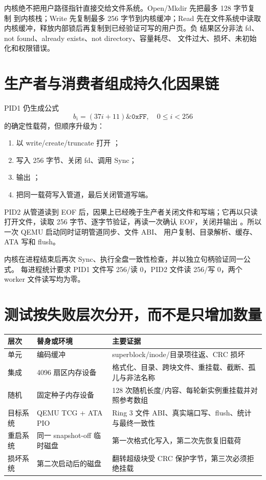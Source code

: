 内核绝不把用户路径指针直接交给文件系统。Open/Mkdir 先把最多 128 字节复制
到内核栈；Write 先复制最多 256 字节到内核缓冲；Read 先在文件系统中读取
内核缓冲，释放内部锁后再复制到已经验证可写的用户页。负 
结果区分非法 fd、not found、already exists、not directory、容量耗尽、
文件过大、损坏、未初始化和权限错误。

\section{生产者与消费者组成持久化因果链}

PID1 仍生成公式
\[
  b_i=(37i+11)\mathbin{\&}\mathtt{0xFF},\quad 0\le i<256
\]
的确定性载荷，但顺序升级为：

\begin{enumerate}[label=\arabic*.]
  \item 以 write/create/truncate 打开 ；
  \item 写入 256 字节、关闭 fd、调用 Sync；
  \item 输出 ；
  \item 把同一载荷写入管道，最后关闭管道写端。
\end{enumerate}

PID2 从管道读到 EOF 后，因果上已经晚于生产者关闭文件和写端；它再以只读
打开文件，读取 256 字节、逐字节验证，再读一次确认 EOF，关闭并输出
。所以一次 QEMU 启动同时证明管道同步、文件 ABI、
用户复制、目录解析、缓存、ATA 写和 flush。

内核在进程结束后再次 Sync、执行全盘一致性检查，并以独立句柄验证同一公式。
每进程统计要求 PID1 文件写 256/读 0，PID2 文件读 256/写 0，两个 worker
文件读写均为零。

\section{测试按失败层次分开，而不是只增加数量}

\begin{longtable}{L{0.19\textwidth}L{0.28\textwidth}L{0.41\textwidth}}
\toprule
层次 & 替身或环境 & 主要证据\\
\midrule
单元 & 编码缓冲 & superblock/inode/目录项往返、CRC 损坏\\
集成 & 4096 扇区内存设备 & 格式化、目录、跨块文件、重挂载、截断、孤儿与非法名称\\
随机 & 固定种子内存设备 & 128 次随机长度/内容、每轮新实例重挂载并对照参考数组\\
目标系统 & QEMU TCG + ATA PIO & Ring 3 文件 ABI、真实端口写、flush、统计与最终一致性\\
重启系统 & 同一 snapshot-off 临时磁盘 & 第一次格式化写入，第二次先恢复旧载荷\\
损坏系统 & 第二次启动后的磁盘 & 翻转超级块受 CRC 保护字节，第三次必须拒绝挂载\\
\bottomrule
\end{longtable}

